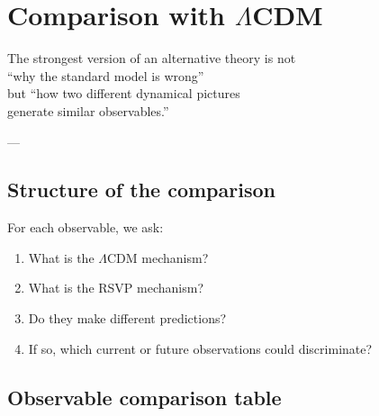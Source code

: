 
\chapter{Comparison with $\Lambda$CDM}
\label{ch:lcdm-comparison}

\epigraph{%
  The strongest version of an alternative theory is not\\
  ``why the standard model is wrong''\\
  but ``how two different dynamical pictures\\
  generate similar observables.''%
}{---}

\section{Structure of the comparison}

For each observable, we ask:
\begin{enumerate}[leftmargin=2em]
  \item What is the $\Lambda$CDM mechanism?
  \item What is the RSVP mechanism?
  \item Do they make different predictions?
  \item If so, which current or future observations could
    discriminate?
\end{enumerate}

\section{Observable comparison table}


